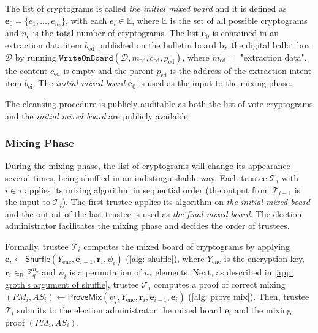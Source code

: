 The list of cryptograms is called \textit{the initial mixed board} and it is defined as $\boldsymbol{e}_0 = \{ e_1, ..., e_{n_\mathrm{e}} \}$, with each $e_i \in \mathbb{E}$, where $\mathbb{E}$ is the set of all possible cryptograms and $n_\mathrm{e}$ is the total number of cryptograms. The list $\boldsymbol{e}_0$ is contained in an extraction data item $b_\mathrm{ed}$ published on the bulletin board by the digital ballot box $\mathcal{D}$ by running $\mathtt{WriteOnBoard}(\mathcal{D}, m_\mathrm{ed}, c_\mathrm{ed}, p_\mathrm{ed})$, where $m_\mathrm{ed} = $ "extraction data", the content $c_\mathrm{ed}$ is empty and the parent $p_\mathrm{ed}$ is the address of the extraction intent item $b_\mathrm{ei}$. The \textit{initial mixed board} $\boldsymbol{e}_0$ is used as the input to the mixing phase.

The cleansing procedure is publicly auditable as both the list of vote cryptograms and the \textit{initial mixed board} are publicly available.


\subsubsection{Mixing Phase} \label{sec: mixing phase}
During the mixing phase, the list of cryptograms will change its appearance several times, being shuffled in an indistinguishable way. Each trustee $\mathcal{T}_i$ with $i \in \tau$ applies its mixing algorithm in sequential order (the output from $\mathcal{T}_{i-1}$ is the input to $\mathcal{T}_i$). The first trustee applies its algorithm on \textit{the initial mixed board} and the output of the last trustee is used as \textit{the final mixed board}. The election administrator facilitates the mixing phase and decides the order of trustees.

Formally, trustee $\mathcal{T}_i$ computes the mixed board of cryptograms by applying $\boldsymbol{e}_i \gets \mathsf{Shuffle}(Y_\mathrm{enc}, \boldsymbol{e}_{i-1}, \boldsymbol{r}_i, \psi_i)$ (\cref{alg: shuffle}), where $Y_\mathrm{enc}$ is the encryption key, $\boldsymbol{r}_i \in_\mathrm{R} \mathbb{Z}_q^{n_\mathrm{e}}$ and $\psi_i$ is a permutation of $n_\mathrm{e}$ elements. Next, as described in \cref{app: groth's argument of shuffle}, trustee $\mathcal{T}_i$ computes a proof of correct mixing $(PM_i, AS_i) \gets \mathsf{ProveMix}(\psi_i, Y_\mathrm{enc}, \boldsymbol{r}_i, \boldsymbol{e}_{i-1}, \boldsymbol{e}_i)$ (\cref{alg: prove mix}). Then, trustee $\mathcal{T}_i$ submits to the election administrator the mixed board $\boldsymbol{e}_i$ and the mixing proof $(PM_i, AS_i)$.

